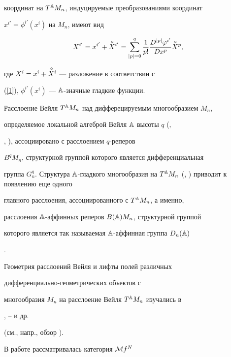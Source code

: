 координат на $T^{\Bbb A} M_n$, индуцируемые преобразованиями координат


$x^{i'}=\phi^{i'}(x^i)$ на $M_n$, имеют вид


\begin{equation}


X^{i'}=x^{i'}+\rad{X}^{i'}=


\sum^q_{|p|=0}\frac{1}{p!}\frac{D^{|p|}\phi^{i'}}{Dx^p}\rad{X}^p,


\label{trans}


\end{equation}


где $X^{i}=x^{i}+\overset{\,\circ}{X}{}^{i}$  ---  разложение в соответствии с


(\ref{1}), $\phi^{i'}(x^i)$ ---  ${\Bbb A}$-знач\-ные гладкие функции.





Расслоение Вейля $T^{\Bbb A} M_n$ над дифферецируемым многообразием $M_n$,


определяемое локальной алгеброй Вейля ${\Bbb A}$ высоты $q$ (\cite{Weil},


\cite{KMS}, \cite{Shir}),  ассоциировано с расслоением $q$-реперов


$B^qM_n$, структурной группой которого является дифференциальная


группа $G^q_n$. Структура $\A$-гладкого многообразия на $T^\A


M_n$ (\cite{VSh2}, \cite{Shir}) приводит к появлению еще одного


главного расслоения, ассоциированного с $T^{\Bbb A} M_n$, а именно,


расслоения ${\Bbb A}$-аффинных реперов $B({\Bbb A})M_n$, структурной группой


которого является так называемая ${\Bbb A}$-аффинная группа $D_n({\Bbb A})$


\cite{VSh1}.





Геометрия расслоений Вейля и лифты полей различных


дифференциально-геометрических объектов с


многообразия $M_n$ на расслоение Вейля $T^{\Bbb A} M_n$ изучались в


\cite{VSh1}, \cite{Shir}--\cite{Yuen2} и др.


(см., напр., обзор \cite{Shir}).





В работе \cite{Bush1} рассматривалась категория ${\cal M} f^N$


